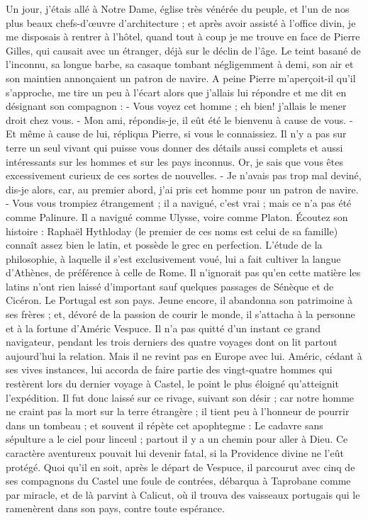 \documentclass[12pt,a4paper]{book}
\begin{document}
\begin{pages}
\begin{Rightside}
        Un jour, j'étais allé à Notre Dame, église très vénérée du peuple, et l'un de nos plus beaux chefs-d'œuvre d'architecture ; et après avoir assisté à l'office divin, je me disposais à rentrer à l'hôtel, quand tout à coup je me trouve en face de Pierre Gilles, qui causait avec un étranger, déjà sur le déclin de l'âge. Le teint basané de l'inconnu, sa longue barbe, sa casaque tombant négligemment à demi, son air et son maintien annonçaient un patron de navire. A peine Pierre m'aperçoit-il qu'il s'approche, me tire un peu à l'écart alors que j'allais lui répondre et me dit en désignant son compagnon : - Vous voyez cet homme ; eh bien! j'allais le mener droit chez vous. - Mon ami, répondis-je, il eût été le bienvenu à cause de vous. - Et même à cause de lui, répliqua Pierre, si vous le connaissiez. Il n'y a pas sur terre un seul vivant qui puisse vous donner des détails aussi complets et aussi intéressants sur les hommes et sur les pays inconnus. Or, je sais que vous êtes excessivement curieux de ces sortes de nouvelles. - Je n'avais pas trop mal deviné, dis-je alors, car, au premier abord, j'ai pris cet homme pour un patron de navire. - Vous vous trompiez étrangement ; il a navigué, c'est vrai ; mais ce n'a pas été comme Palinure. Il a navigué comme Ulysse, voire comme Platon.
		\pend
		\pstart
        Écoutez son histoire : Raphaël Hythloday (le premier de ces noms est celui de sa famille) connaît assez bien le latin, et possède le grec en perfection. L'étude de la philosophie, à laquelle il s'est exclusivement voué, lui a fait cultiver la langue d'Athènes, de préférence à celle de Rome. Il n'ignorait pas qu'en cette matière les latins n'ont rien laissé d'important sauf quelques passages de Sénèque et de Cicéron. Le Portugal est son pays. Jeune encore, il abandonna son patrimoine à ses frères ; et, dévoré de la passion de courir le monde, il s'attacha à la personne et à la fortune d'Améric Vespuce. Il n'a pas quitté d'un instant ce grand navigateur, pendant les trois derniers des quatre voyages dont on lit partout aujourd'hui la relation. Mais il ne revint pas en Europe avec lui. Améric, cédant à ses vives instances, lui accorda de faire partie des vingt-quatre hommes qui restèrent lors du dernier voyage à Castel, le point le plus éloigné qu'atteignit l'expédition. Il fut donc laissé sur ce rivage, suivant son désir ; car notre homme ne craint pas la mort sur la terre étrangère ; il tient peu à l'honneur de pourrir dans un tombeau ; et souvent il répète cet apophtegme : Le cadavre sans sépulture a le ciel pour linceul ; partout il y a un chemin pour aller à Dieu. Ce caractère aventureux pouvait lui devenir fatal, si la Providence divine ne l'eût protégé.
        \pend
        \pstart
        Quoi qu'il en soit, après le départ de Vespuce, il parcourut avec cinq de ses compagnons du Castel une foule de contrées, débarqua à Taprobane comme par miracle, et de là parvint à Calicut, où il trouva des vaisseaux portugais qui le ramenèrent dans son pays, contre toute espérance.
        \pend
        \endnumbering
    \end{Rightside}
 \end{pages}
 \Pages
\end{document}

